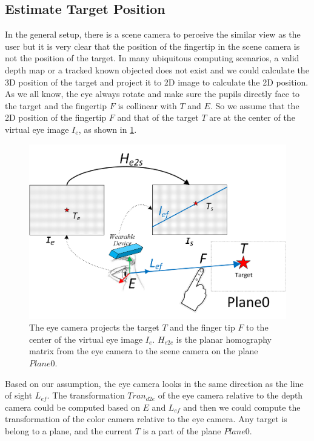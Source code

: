\subsection{Estimate Target Position}
In the general setup, there is a scene camera to perceive the similar view as the user but it is very clear that the position of the fingertip in the scene camera is not the position of the target. In many ubiquitous computing scenarios, a valid depth map or a tracked known objected does not exist and we could calculate the 3D position of the target and project it to 2D image to calculate the 2D position. As we all know, the eye always rotate and make sure the pupils directly face to the target and the fingertip $F$ is collinear with  $T$ and $E$. So we assume that the 2D position of the fingertip $F$ and that of the target $T$  are at the center of the virtual eye image $I_{e}$, as shown in \figurename{\ref{fig:4-UP:noDepth}}.
\begin{figure}[htb]
	\centering
	\includegraphics[width = \linewidth]{figures/4-UP/NoDepth.png}
	\caption{The eye camera projects the target $T$  and the finger tip $F$ to the center of the virtual eye image $I_{e}$.  $H_{e2c}$  is the planar homography matrix from the  eye camera to the scene camera on the plane $Plane0$.}
	\label{fig:4-UP:noDepth}
\end{figure}
Based on our assumption, the eye camera looks in the same direction as the line of sight $L_{ef}$. The transformation  $Tran_{d2e}$ of the eye camera relative to the depth camera could be computed based on $E$ and $L_{ef}$ and then we could compute the transformation of the color camera relative to the eye camera. Any target is belong to a plane, and the current $T$ is a part of the plane $Plane0$. 
